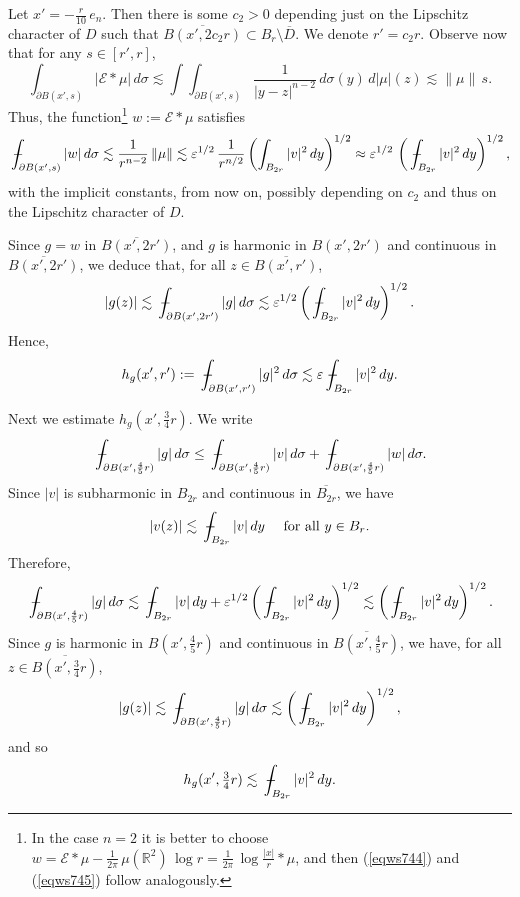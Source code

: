 \documentclass[11pt]{amsart}
\newcommand{\R}{{\mathbb R}}       %
\newcommand{\EE}{{\mathcal E}}
\newcommand{\rf}[1]{{(\ref{#1})}}
\newcommand{\ve}{{\varepsilon}}
\def\Xint#1{\mathchoice
{\XXint\displaystyle\textstyle{#1}}%
{\XXint\textstyle\scriptstyle{#1}}%
{\XXint\scriptstyle\scriptscriptstyle{#1}}%
{\XXint\scriptscriptstyle\scriptscriptstyle{#1}}%
\!\int}
\def\XXint#1#2#3{{\setbox0=\hbox{$#1{#2#3}{\int}$ }
\vcenter{\hbox{$#2#3$ }}\kern-.58\wd0}}
\def\avint{\;\Xint-}
\theoremstyle{definition}
\theoremstyle{remark}
\numberwithin{equation}{section}
\begin{document}
Let $x'=-\frac {r}{10}\,e_n$. Then there is some $c_2>0$ depending just on
 the Lipschitz character of $D$ such that
 $\overline{B(x',2c_2r)}\subset B_r\setminus \overline{D}$. We denote $r'=c_2r$.
  Observe now that for any $s\in[r',r]$,
\begin{equation}\label{eqws744}
\int_{\partial B(x',s)} |\EE * \mu| \,d\sigma \lesssim \int \!\!\int_{\partial B(x',s)}
\frac1{|y-z|^{n-2}}\,d\sigma(y)\,d|\mu|(z) \lesssim \|\mu\|\,s.
\end{equation}
Thus, the function\footnote{In the case $n=2$ it is better to choose 
$w= \EE * \mu - \frac1{2\pi}\, \mu(\R^2)\,\log r = \frac1{2\pi}\,\log\frac{|x|}r * \mu$, and then
\rf{eqws744} and \rf{eqws745} follow analogously.}
 $w:=\EE*\mu$ satisfies
\begin{equation}\label{eqws745}
\avint_{\partial B(x',s)}|w|\,d\sigma \lesssim \frac1{r^{n-2}}\,\|\mu\|
\lesssim \ve^{1/2}\, \frac1{r^{n/2}} \left(\int_{B_{2r}}|v|^2\,dy\right)^{1/2}
\approx  \ve^{1/2}\,  \left(\avint_{B_{2r}}|v|^2\,dy\right)^{1/2}
,
\end{equation}
with the implicit constants, from now on, possibly depending on $c_2$ and thus on the Lipschitz character of $D$.

Since $g=w$ in $\overline{B(x',2r')}$, and $g$ is harmonic in $B(x',2r')$ and continuous in
$\overline{B(x',2r')}$, we deduce that, for all $z\in 
\overline{B(x',r')}$, 
$$|g(z)|\lesssim \avint_{\partial B(x',2r')}|g|\,d\sigma 
\lesssim \ve^{1/2} \left(\avint_{B_{2r}}|v|^2\,dy\right)^{1/2}.
$$
Hence,
$$h_g(x',r') := \avint_{\partial B(x',r')}|g|^2\,d\sigma \lesssim \ve\avint_{B_{2r}}|v|^2\,dy.
$$

Next we estimate $h_g(x',\frac34 r)$. We write
$$\avint_{\partial B(x',\frac45r)}|g|\,d\sigma \leq \avint_{\partial B(x',\frac45r)}|v|\,d\sigma
+ \avint_{\partial B(x',\frac45r)}|w|\,d\sigma.$$
Since $|v|$ is subharmonic in $B_{2r}$ and continuous in $\overline{B_{2r}}$, we have
$$|v(z)| \lesssim \avint_{B_{2r}} |v|\,dy\quad \mbox{ for all $y\in B_r$.}$$
Therefore,
$$\avint_{\partial B(x',\frac45r)}|g|\,d\sigma \lesssim \avint_{B_{2r}} |v|\,dy + \ve^{1/2} \left(\avint_{B_{2r}}|v|^2\,dy\right)^{1/2} \lesssim \left(\avint_{B_{2r}}|v|^2\,dy\right)^{1/2}.$$
Since $g$ is harmonic in $B(x',\frac45 r)$ and continuous in
$\overline{B(x',\frac45r)}$, we have, for all $z\in 
\overline{B(x',\frac34 r)}$,
$$|g(z)|\lesssim
\avint_{\partial B(x',\frac45r)}|g|\,d\sigma \lesssim \left(\avint_{B_{2r}}|v|^2\,dy\right)^{1/2},$$
and so 
$$h_g(x',\tfrac34r) \lesssim
\avint_{B_{2r}}|v|^2\,dy.$$
\end{document}
